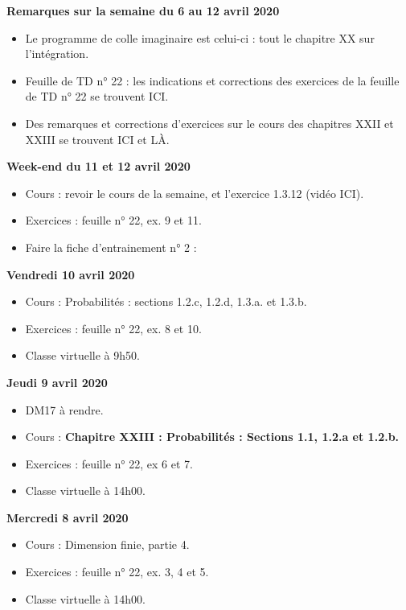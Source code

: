 \documentclass[12pt,a4paper]{article}
\begin{document}
\noindent\textbf{\bf Remarques sur la semaine du 6 au 12 avril 2020}
\begin{itemize}
\item Le programme de colle imaginaire est celui-ci : tout le chapitre XX sur l'intégration.
\item Feuille de TD n° 22 : les indications et corrections des exercices de la feuille de TD n° 22 se trouvent ICI.
\item Des remarques et corrections d'exercices sur le cours des chapitres XXII et XXIII se trouvent ICI et LÀ.\vspace{.4cm}
\end{itemize}

\noindent\textbf{Week-end du 11 et 12 avril 2020}
\begin{itemize}
\item Cours : revoir le cours de la semaine, et l'exercice 1.3.12 (vidéo ICI).
\item Exercices : feuille n° 22, ex. 9 et 11.
\item Faire la fiche d'entrainement n° 2 : 
\vspace{.4cm}
\end{itemize}

\noindent\textbf{\bf Vendredi 10 avril 2020}
\begin{itemize}
\item Cours : Probabilités : sections 1.2.c, 1.2.d, 1.3.a. et 1.3.b.
\item Exercices : feuille n° 22, ex. 8 et 10.
\item Classe virtuelle à 9h50.\vspace{.4cm}
\end{itemize}

\noindent\textbf{Jeudi 9 avril 2020}
\begin{itemize}
\item DM17 à rendre.
\item Cours : \bf Chapitre XXIII \rm : Probabilités : Sections 1.1, 1.2.a et 1.2.b.
\item Exercices : feuille n° 22, ex 6 et 7.
\item Classe virtuelle à 14h00.\vspace{.4cm}
\end{itemize}

\noindent\textbf{Mercredi 8 avril 2020}
\begin{itemize}
\item Cours : Dimension finie, partie 4.
\item Exercices : feuille n° 22, ex. 3, 4 et 5.
\item Classe virtuelle à 14h00.\vspace{.4cm}
\end{itemize}
\end{document}

